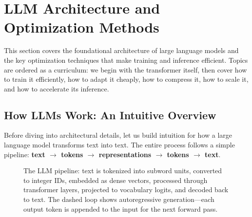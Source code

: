 \chapter{LLM Architecture and Optimization Methods}
\label{llm-architecture-and-optimization-methods}

This section covers the foundational architecture of large language models and the key optimization techniques that make training and inference efficient. Topics are ordered as a curriculum: we begin with the transformer itself, then cover how to train it efficiently, how to adapt it cheaply, how to compress it, how to scale it, and how to accelerate its inference.

\section{How LLMs Work: An Intuitive Overview}
\label{how-llms-work-an-intuitive-overview}

Before diving into architectural details, let us build intuition for how a large language model transforms text into text. The entire process follows a simple pipeline: \textbf{text $\to$ tokens $\to$ representations $\to$ tokens $\to$ text}.

\begin{figure}[ht!]
\centering
{}
\caption{The LLM pipeline: text is tokenized into subword units, converted to integer IDs, embedded as dense vectors, processed through transformer layers, projected to vocabulary logits, and decoded back to text. The dashed loop shows autoregressive generation---each output token is appended to the input for the next forward pass.}
\label{fig:llm-pipeline}
\end{figure}


